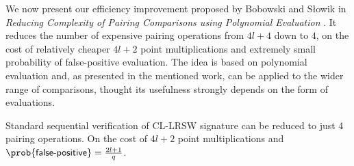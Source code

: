 We now present our efficiency improvement proposed by Bobowski and Słowik in \emph{Reducing Complexity of Pairing Comparisons using Polynomial Evaluation} \cite{complexity-reduction-bobowski}. It reduces the number of expensive pairing operations from $4l + 4$ down to $4$, on the cost of relatively cheaper $4l + 2$ point multiplications and extremely small probability of false-positive evaluation. 
The idea is based on polynomial evaluation and, as presented in the mentioned work, can be applied to the wider range of comparisons, thought its usefulness strongly depends on the form of evaluations.


\begin{corollary}
Standard sequential verification of CL-LRSW signature can be reduced to just 4 pairing operations.
On the cost of $4l+2$ point multiplications and $\prob{\textsf{false-positive}} = \frac{2l+1}{q}$.
\begin{pcvstack}[center]

\pcvspace

\end{pcvstack}

\end{corollary}


